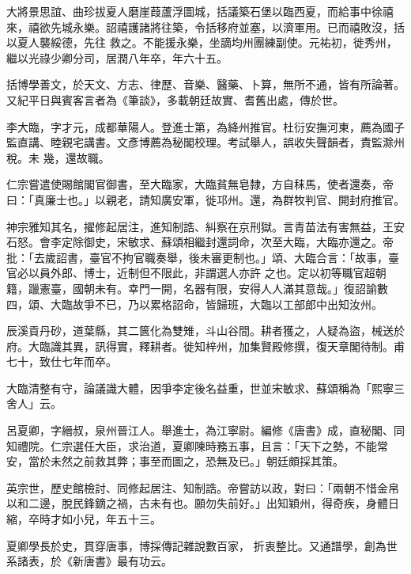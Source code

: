 \begin{pinyinscope}
 大將景思誼、曲珍拔夏人磨崖葭蘆浮圖城，括議築石堡以臨西夏，而給事中徐禧來，禧欲先城永樂。詔禧護諸將往築，令括移府並塞，以濟軍用。已而禧敗沒，括以夏人襲綏德，先往
 救之。不能援永樂，坐謫均州團練副使。元祐初，徙秀州，繼以光祿少卿分司，居潤八年卒，年六十五。



 括博學善文，於天文、方志、律歷、音樂、醫藥、卜算，無所不通，皆有所論著。又紀平日與賓客言者為《筆談》，多載朝廷故實、耆舊出處，傳於世。



 李大臨，字才元，成都華陽人。登進士第，為絳州推官。杜衍安撫河東，薦為國子監直講、睦親宅講書。文彥博薦為秘閣校理。考試舉人，誤收失聲韻者，責監滁州稅。未
 幾，還故職。



 仁宗嘗遣使賜館閣官御書，至大臨家，大臨貧無皂隸，方自秣馬，使者還奏，帝曰：「真廉士也。」以親老，請知廣安軍，徙邛州。還，為群牧判官、開封府推官。



 神宗雅知其名，擢修起居注，進知制誥、糾察在京刑獄。言青苗法有害無益，王安石怒。會李定除御史，宋敏求、蘇頌相繼封還詞命，次至大臨，大臨亦還之。帝批：「去歲詔書，臺官不拘官職奏舉，後未審更制也。」頌、大臨合言：「故事，臺官必以員外郎、博士，近制但不限此，非謂選人亦許
 之也。定以初等職官超朝籍，躐憲臺，國朝未有。幸門一開，名器有限，安得人人滿其意哉。」復詔諭數四，頌、大臨故爭不已，乃以累格詔命，皆歸班，大臨以工部郎中出知汝州。



 辰溪貢丹砂，道葉縣，其二篋化為雙雉，斗山谷間。耕者獲之，人疑為盜，械送於府。大臨識其異，訊得實，釋耕者。徙知梓州，加集賢殿修撰，復天章閣待制。甫七十，致仕七年而卒。



 大臨清整有守，論議識大體，因爭李定後名益重，世並宋敏求、蘇頌稱為「熙寧三舍人」云。



 呂夏卿，字縉叔，泉州晉江人。舉進士，為江寧尉。編修《唐書》成，直秘閣、同知禮院。仁宗選任大臣，求治道，夏卿陳時務五事，且言：「天下之勢，不能常安，當於未然之前救其弊；事至而圖之，恐無及已。」朝廷頗採其策。



 英宗世，歷史館檢討、同修起居注、知制誥。帝嘗訪以政，對曰：「兩朝不惜金帛以和二邊，脫民鋒鏑之禍，古未有也。願勿失前好。」出知穎州，得奇疾，身體日縮，卒時才如小兒，年五十三。



 夏卿學長於史，貫穿唐事，博採傳記雜說數百家，
 折衷整比。又通譜學，創為世系諸表，於《新唐書》最有功云。




\end{pinyinscope}
